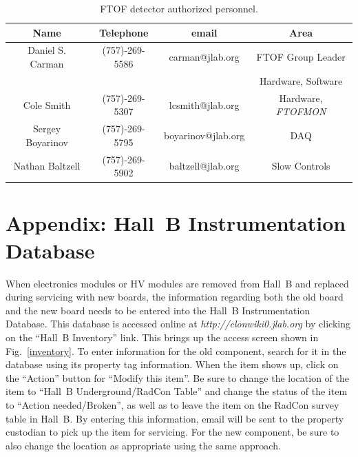 \documentclass[12pt]{article}
\begin{document}
\begin{table}[htbp]
\begin{center}
\begin{tabular} {|c|c|c|c|} \hline
Name             & Telephone      & email              & Area             \\ \hline \hline
Daniel S. Carman & (757)-269-5586 & carman@jlab.org    & FTOF Group Leader\\
                 &                &                    & Hardware, Software \\ \hline
Cole Smith       & (757)-269-5307 & lcsmith@jlab.org   & Hardware, {\it FTOFMON} \\ \hline
Sergey Boyarinov & (757)-269-5795 & boyarinov@jlab.org & DAQ              \\ \hline
Nathan Baltzell  & (757)-269-5902 & baltzell@jlab.org  & Slow Controls    \\ \hline
\end{tabular}
\caption{FTOF detector authorized personnel.}
\label{expert-list}
\end{center}
\end{table}

\clearpage

\vfil
\eject

\section{Appendix: Hall~B Instrumentation Database}

When electronics modules or HV modules are removed from Hall~B and replaced during 
servicing with new boards, the information regarding both the old board and the new 
board needs to be entered into the Hall~B Instrumentation Database. This database is 
accessed online at {\it http://clonwiki0.jlab.org} by clicking on the ``Hall~B 
Inventory'' link. This brings up the access screen shown in Fig.~\ref{inventory}. To 
enter information for the old component, search for it in the database using its 
property tag information. When the item shows up, click on the ``Action'' button for 
``Modify this item''. Be sure to change the location of the item to ``Hall~B 
Underground/RadCon Table'' and change the status of the item to ``Action 
needed/Broken'', as well as to leave the item on the RadCon survey table in Hall~B. By 
entering this information, email will be sent to the property custodian to pick up the 
item for servicing. For the new component, be sure to also change the location as 
appropriate using the same approach.
\end{document}
